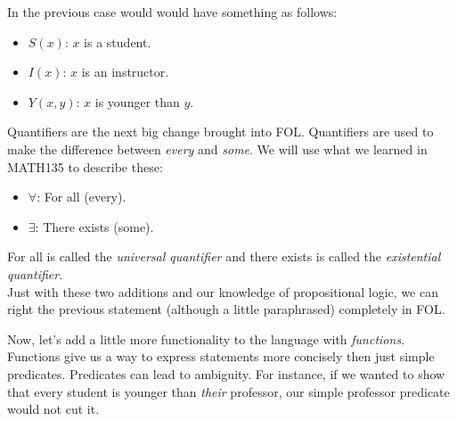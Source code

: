 In the previous case would would have something as follows:\\
\begin{itemize}
\item $S(x)$:	$x$ is a student.
\item $I(x)$:	$x$ is an instructor.
\item $Y(x,y)$:	$x$ is younger than $y$.
\end{itemize}

Quantifiers are the next big change brought into FOL.  Quantifiers are used to make the difference between \emph{every} and \emph{some}.  We will use what we learned in MATH135 to describe these:\\
\begin{itemize}
\item $\forall$:	For all (every).
\item $\exists$:	There exists (some).
\end{itemize}

For all is called the \emph{universal quantifier} and there exists is called the \emph{existential quantifier}.\\

Just with these two additions and our knowledge of propositional logic, we can right the previous statement (although a little paraphrased) completely in FOL.


Now, let's add a little more functionality to the language with \emph{functions}.\\

Functions give us a way to express statements more concisely then just simple predicates.  Predicates can lead to ambiguity.  For instance, if we wanted to show that every student is younger than \emph{their} professor, our simple professor predicate would not cut it.\\


